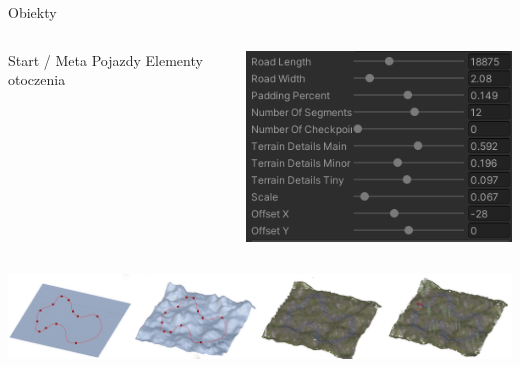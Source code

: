 \begin{frame}{Obiekty}

	\begin{columns}

		\begin{column}{.55\hsize}
			\begin{itemize}
				\myitem Start / Meta
				\myitem Pojazdy
				\myitem Elementy otoczenia
			\end{itemize}
		\end{column}
		
		\begin{column}{.45\hsize}
			\includegraphics[width=\linewidth]{figures/terrain_gen_params.png}
		\end{column}

	\end{columns}

	\vspace{1.5cm}
	\includegraphics[width=\linewidth]{figures/terrain_creation_4_2.png}

\end{frame}
